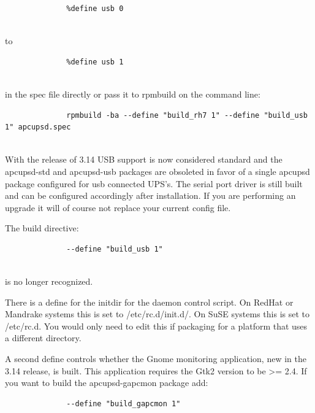 {{{{{{{{{\begin{description}
\footnotesize
\begin{verbatim}
              %define usb 0
     
\end{verbatim}
\normalsize

to  

\footnotesize
\begin{verbatim}
              %define usb 1
     
\end{verbatim}
\normalsize

in the spec file directly or pass it to rpmbuild on the command line:  

\footnotesize
\begin{verbatim}
              rpmbuild -ba --define "build_rh7 1" --define "build_usb 1" apcupsd.spec
     
\end{verbatim}
\normalsize

   With the release of 3.14 USB support is now considered standard and the 
apcupsd-std and apcupsd-usb packages are obsoleted in favor of a single 
apcupsd package configured for usb connected UPS's.  The serial port driver 
is still built and can be configured accordingly after installation. If you 
are performing an upgrade it will of course not replace your current config file.

   The build directive:


\footnotesize
\begin{verbatim}
              --define "build_usb 1"
     
\end{verbatim}
\normalsize

is no longer recognized.

\item [{\bf What other defines are used?}]
   There is a define for the initdir for the daemon control script. On
RedHat or Mandrake systems this is set to /etc/rc.d/init.d/. On SuSE systems this is 
set to /etc/rc.d.  You would only need to edit this if packaging for a platform that 
uses a different directory.

   A second define controls whether the Gnome monitoring application, new in the 
3.14 release, is built.  This application requires the Gtk2 version to be >= 2.4. 
If you want to build the apcupsd-gapcmon package add:

\footnotesize
\begin{verbatim}
              --define "build_gapcmon 1"
     

\end{verbatim}
\end{description}}}}}}}}}}
